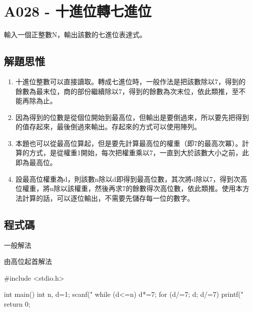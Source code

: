 \section{A028 - 十進位轉七進位}
輸入一個正整數N，輸出該數的七進位表達式。

\subsection{解題思惟}
\begin{enumerate}
	\item 十進位整數可以直接讀取。轉成七進位時，一般作法是把該數除以7，得到的餘數為最末位，商的部份繼續除以7，得到的餘數為次末位，依此類推，至不能再除為止。
	\item 因為得到的位數是從個位開始到最高位，但輸出是要倒過來，所以要先把得到的值存起來，最後倒過來輸出。存起來的方式可以使用陣列。
	\item 本題也可以從最高位算起，但是要先計算最高位的權重（即7的最高次冪）。計算的方式，是從權重1開始，每次把權重乘以7，一直到大於該數大小之前，此即為最高位。
	\item 設最高位權重為d，則該數n除以d即得到最高位數，其次將d除以7，得到次高位權重，將n除以該權重，然後再求7的餘數得次高位數，依此類推。使用本方法計算的話，可以逐位輸出，不需要先儲存每一位的數字。
\end{enumerate}

\subsection{程式碼}
一般解法
	
由高位起首解法
\begin{cppcode}
#include <stdio.h>

int main()
{
	int n, d=1;
	scanf("%
	while (d<=n) d*=7;
	for (d/=7; d; d/=7) printf("%
	return 0;
}    
\end{cppcode}
